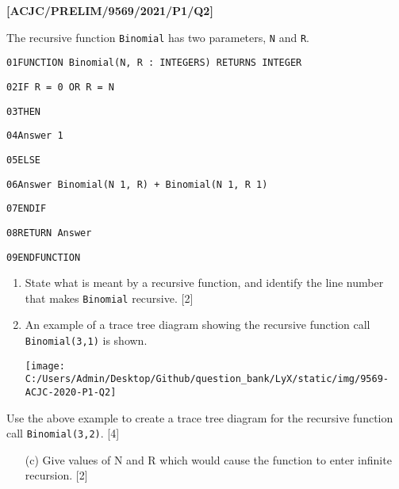 \item \textbf{{[}ACJC/PRELIM/9569/2021/P1/Q2{]} }

The recursive function \texttt{Binomial} has two parameters, \texttt{N}
and \texttt{R}.

\noindent %
\noindent\begin{minipage}[t]{1\columnwidth}%
\texttt{01\qquad{}FUNCTION Binomial(N, R : INTEGERS) RETURNS INTEGER }

\texttt{02\qquad{}\qquad{}IF R = 0 OR R = N }

\texttt{03\qquad{}\qquad{}\qquad{}THEN }

\texttt{04\qquad{}\qquad{}\qquad{}\qquad{}Answer \textleftarrow{}
1 }

\texttt{05\qquad{}\qquad{}\qquad{}ELSE }

\texttt{06\qquad{}\qquad{}\qquad{}\qquad{}Answer \textleftarrow{}
Binomial(N \textendash{} 1, R) + Binomial(N \textendash{} 1, R \textendash{}
1) }

\texttt{07\qquad{}\qquad{}ENDIF }

\texttt{08\qquad{}\qquad{}RETURN Answer }

\texttt{09\qquad{}ENDFUNCTION}%
\end{minipage}
\begin{enumerate}
\item State what is meant by a recursive function, and identify the line
number that makes \texttt{Binomial} recursive. \hfill{}{[}2{]}
\item An example of a trace tree diagram showing the recursive function
call \texttt{Binomial(3,1)} is shown.
\begin{center}
\texttt{[image: C:/Users/Admin/Desktop/Github/question\_bank/LyX/static/img/9569-ACJC-2020-P1-Q2]}
\par\end{center}

\end{enumerate}
Use the above example to create a trace tree diagram for the recursive
function call \texttt{Binomial(3,2)}. \hfill{}{[}4{]}
\begin{enumerate}
\item[(c)] Give values of N and R which would cause the function to enter infinite
recursion. \hfill{}{[}2{]}
\end{enumerate}